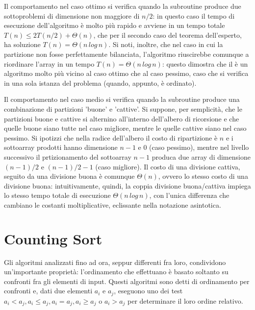 \vspace*{10pt}

Il comportamento nel caso ottimo si verifica quando la subroutine  produce due sottoproblemi di dimensione non maggiore di \(n/2\): in questo caso il tempo di esecuzione dell'algoritmo è molto più rapido e avviene in un tempo totale \(T(n) \le 2T(n/2) + \Theta(n)\), che per il secondo caso del teorema dell'esperto, ha soluzione \(T(n)=\Theta(n\,log\,n)\). Si noti, inoltre, che nel caso in cui la partizione non fosse perfettamente bilanciata, l'algoritmo riuscirebbe comunque a riordinare l'array in un tempo \(T(n)=\Theta(n\,log\,n)\): questo dimostra che il  è un algoritmo molto più vicino al caso ottimo che al caso pessimo, caso che si verifica in una sola istanza del problema (quando, appunto, è ordinato). 

\vspace*{10pt}

Il comportamento nel caso medio si verifica quando la subroutine  produce una combinazione di partizioni 'buone' e 'cattive'. Si suppone, per semplicità, che le partizioni buone e cattive si alternino all'interno dell'albero di ricorsione e che quelle buone siano tutte nel caso migliore, mentre le quelle cattive siano nel caso pessimo. Si ipotizzi che nella radice dell'albero il costo di ripartizione è \(n\) e i sottoarray prodotti hanno dimensione \(n-1\) e 0 (caso pessimo), mentre nel livello successivo il prtizionamento del sottoarray \(n-1\) produca due array di dimensione \((n-1)/2\) e \((n-1)/2 - 1\) (caso migliore). Il costo di una divisione cattiva, seguito da una divisione buona è comunque \(\Theta(n)\), ovvero lo stesso costo di una divisione buona: intuitivamente, quindi, la coppia divisione buona/cattiva impiega lo stesso tempo totale di esecuzione \(\Theta(n\,log\,n)\), con l'unica differenza che cambiano le costanti moltiplicative, eclissante nella notazione asintotica.

\section{Counting Sort}
Gli algoritmi analizzati fino ad ora, seppur differenti fra loro, condividono un'importante proprietà: l'ordinamento che effettuano è basato soltanto su confronti fra gli elementi di input. Questi algoritmi sono detti di ordinamento per confronti e, dati due elementi \(a_i\) e \(a_j\), eseguono uno dei test \(a_i < a_j, a_i\le a_j, a_i=a_j, a_i\ge a_j\) o \(a_i > a_j\) per determinare il loro ordine relativo. 

